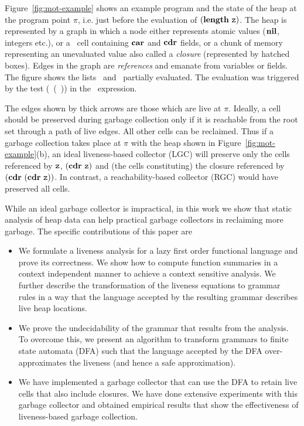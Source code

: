\documentclass[9pt]{sigplanconf}
\begin{document}
Figure~\ref{fig:mot-example} shows an example program and the state of
the heap at  the program point $\pi$, i.e. just  before the evaluation
of $(\mathbf{length}\  \mbox{\tt z})$.  The heap is  represented by a graph  in which a
node either  represents atomic  values ($\mbox{$\mathbf{ nil}$}$,  integers etc.),  or a
\CONS\ cell containing $\mbox{$\mathbf{car}$}$ and $\mbox{$\mathbf{cdr}$}$  fields, or a chunk of memory
representing  an  unevaluated  value   also  called  a  {\em  closure}
(represented  by  hatched  boxes).   Edges   in  the  graph  are  {\em
  references} and emanate from variables  or fields.  The figure shows
the  lists \px\  and  \pz\ partially  evaluated.   The evaluation  was
triggered    by   the    test   (\NULLQ~(\CAR~\pz))    in   the
\SIF\ expression.


The edges  shown by thick  arrows are those  which are live  at $\pi$.
Ideally, a cell should be  preserved during garbage collection only if
it is reachable from  the root set through a path  of live edges.  All
other  cells can  be reclaimed.   Thus if  a garbage  collection takes
place at $\pi$ with the heap shown in Figure~\ref{fig:mot-example}(b),
an ideal liveness-based  collector (LGC) will preserve  only the cells
referenced by  $\mbox{\tt z}$, $(\mbox{$\mathbf{cdr}$}~ \mbox{\tt z})$  and (the cells  constituting) the
closure   referenced   by   $(\mbox{$\mathbf{cdr}$}~(\mbox{$\mathbf{cdr}$}~\mbox{\tt z}))$.    In   contrast,   a
reachability-based collector (RGC) would have preserved all cells.

While an ideal garbage collector is  impractical, in this work we show
that  static analysis  of  heap data  can help  practical garbage
collectors in reclaiming more  garbage.  The specific contributions of
this paper are
\begin{itemize}
\item  We  formulate  a  liveness  analysis for  a  lazy  first  order
  functional language  and prove its correctness.  We show  how to
  compute  function  summaries  in  a context  independent  manner  to
  achieve  a  context  sensitive  analysis. We  further  describe  the
  transformation of the  liveness equations to grammar rules  in a way
  that the language  accepted by the resulting  grammar describes live
  heap locations.
\item We prove  the undecidability of the grammar  that results from
  the  analysis.   To overcome  this,  we  present an  algorithm  to
  transform grammars  to finite  state automata  (DFA) such  that the
  language accepted by the  DFA over-approximates the liveness (and
  hence a safe approximation).
\item We have implemented a garbage  collector that can use the DFA
  to  retain live  cells that  also include  closures. We  have done
  extensive  experiments with  this garbage  collector and  obtained
  empirical results  that show  the effectiveness  of liveness-based
  garbage collection.
\end{itemize}
\end{document}
